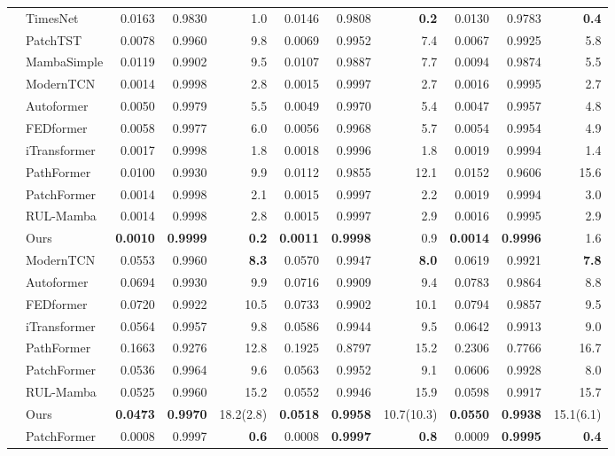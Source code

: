 \begin{table}[!t]
\begin{tabular}{@{}ll rrr rrr rrr@{}}
  & TimesNet & 0.0163 &0.9830&1.0& 0.0146 &0.9808&\textbf{0.2}& 0.0130 &0.9783&\textbf{0.4} \\
  & PatchTST & 0.0078 &0.9960&9.8& 0.0069 &0.9952&7.4& 0.0067 &0.9925&5.8 \\
  & MambaSimple & 0.0119 &0.9902&9.5& 0.0107 &0.9887&7.7& 0.0094 &0.9874&5.5 \\
  & ModernTCN & 0.0014 &0.9998&2.8& 0.0015 &0.9997&2.7& 0.0016 &0.9995&2.7 \\
  & Autoformer & 0.0050 &0.9979&5.5& 0.0049 &0.9970&5.4& 0.0047 &0.9957&4.8 \\
  & FEDformer & 0.0058 &0.9977&6.0& 0.0056 &0.9968&5.7& 0.0054 &0.9954&4.9 \\
  & iTransformer & 0.0017 &0.9998&1.8& 0.0018 &0.9996&1.8& 0.0019 &0.9994&1.4 \\
  & PathFormer & 0.0100 &0.9930&9.9& 0.0112 &0.9855&12.1& 0.0152 &0.9606&15.6 \\
  & PatchFormer & 0.0014 &0.9998&2.1& 0.0015 &0.9997&2.2& 0.0019 &0.9994&3.0 \\
  & RUL-Mamba & 0.0014 &0.9998&2.8& 0.0015 &0.9997&2.9& 0.0016 &0.9995&2.9 \\
  & Ours &\textbf{0.0010}&\textbf{0.9999}&\textbf{0.2}&\textbf{0.0011}&\textbf{0.9998}&0.9&\textbf{0.0014}&\textbf{0.9996}&1.6 \\
\midrule
{} & ModernTCN & 0.0553 &0.9960&\textbf{8.3}& 0.0570 &0.9947&\textbf{8.0}& 0.0619 &0.9921&\textbf{7.8} \\
  & Autoformer & 0.0694 &0.9930&9.9& 0.0716 &0.9909&9.4& 0.0783 &0.9864&8.8 \\
  & FEDformer & 0.0720 &0.9922&10.5& 0.0733 &0.9902&10.1& 0.0794 &0.9857&9.5 \\
  & iTransformer & 0.0564 &0.9957&9.8& 0.0586 &0.9944&9.5& 0.0642 &0.9913&9.0 \\
  & PathFormer & 0.1663 &0.9276&12.8& 0.1925 &0.8797&15.2& 0.2306 &0.7766&16.7 \\
  & PatchFormer & 0.0536 &0.9964&9.6& 0.0563 &0.9952&9.1& 0.0606 &0.9928&8.0 \\
  & RUL-Mamba & 0.0525 &0.9960&15.2& 0.0552 &0.9946&15.9& 0.0598 &0.9917&15.7 \\
  & Ours &\textbf{0.0473}&\textbf{0.9970}&18.2\;(2.8)&\textbf{0.0518}&\textbf{0.9958}&10.7\;(10.3)&\textbf{0.0550}&\textbf{0.9938}&15.1\;(6.1) \\
\midrule
{} & PatchFormer & 0.0008 &0.9997&\textbf{0.6}& 0.0008 &\textbf{0.9997}&\textbf{0.8}& 0.0009 &\textbf{0.9995}&\textbf{0.4} \\

\end{tabular}
\end{table}
